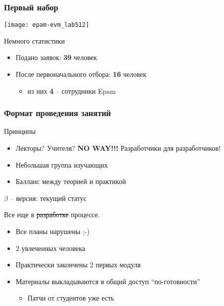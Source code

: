 \begin{frame}
	\frametitle{Первый набор}

	\center\texttt{[image: epam-evm\_lab512]}

	\begin{block}{Немного статистики}
		\begin{itemize}
			\item Подано заявок: {\bf 39} человек
			\item После первоначального отбора: {\bf 16} человек
				\begin{itemize}
					\item из них {\bf 4} -- сотрудники Epam
				\end{itemize}
		\end{itemize}
	\end{block}
\end{frame}

\begin{frame}
	\frametitle{Формат проведения занятий}

	\begin{block}{Принципы}
		\begin{itemize}
			\item Лекторы? Учителя? {\bf NO WAY!!!} 
				Разработчики для разработчиков! 
			\item Небольшая группа изучающих
			\item Балланс между теорией и практикой
		\end{itemize}
	\end{block}

	\pause

	\begin{block}{ $\beta$ -- версия: текущий статус}

		Все еще в \sout{разработке} процессе.

		\begin{itemize}
			\item Все планы нарушены ;-)
			\item 2 увлеченных человека
			\item Практически закончены 2 первых модуля
			\item Материалы выкладываются в общий доступ ``по-готовности''
				\begin{itemize}
					\item Патчи от студентов уже есть
				\end{itemize}
		\end{itemize}
	\end{block}

\end{frame}



